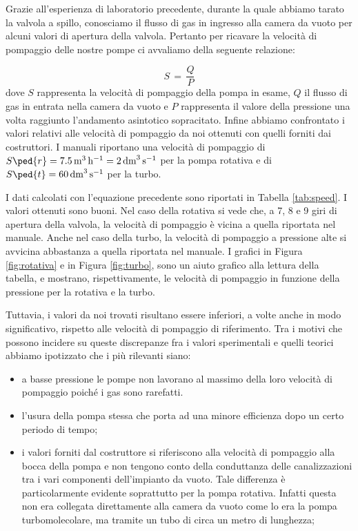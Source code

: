 Grazie all'esperienza di laboratorio precedente, durante la quale abbiamo tarato la valvola a spillo, conosciamo il flusso di gas in ingresso alla camera da vuoto per alcuni valori di apertura della valvola.
Pertanto per ricavare la velocità di pompaggio delle nostre pompe ci avvaliamo della seguente relazione:

\begin{equation}
	S \,=\, \frac{Q}{P}
\end{equation}
%
dove $S$ rappresenta la velocità di pompaggio della pompa in esame, $Q$ il flusso di gas in entrata nella camera da vuoto e $P$ rappresenta il valore della pressione una volta raggiunto l'andamento asintotico sopracitato. Infine abbiamo confrontato i valori relativi alle velocità di pompaggio da noi ottenuti con quelli forniti dai costruttori. I manuali riportano una velocità di pompaggio di $S\ped{r} = \SI{7.5}{\cubic\metre\per\hour} = \SI{2}{\cubic\deci\metre\per\second}$ per la pompa rotativa e di $S\ped{t} = \SI{60}{\cubic\deci\metre\per\second}$ per la turbo.

I dati calcolati con l'equazione precedente sono riportati in Tabella \ref{tab:speed}. I valori ottenuti sono buoni.
Nel caso della rotativa si vede che, a 7, 8 e 9 giri di apertura della valvola, la velocità di pompaggio è vicina a quella riportata
nel manuale. Anche nel caso della turbo, la velocità di pompaggio a pressione alte si avvicina abbastanza a quella riportata nel manuale.
I grafici in Figura \ref{fig:rotativa} e in Figura \ref{fig:turbo}, sono un aiuto grafico alla lettura della tabella, e mostrano,
rispettivamente, le velocità di pompaggio in funzione della pressione per la rotativa e la turbo.

Tuttavia, i valori da noi trovati risultano essere inferiori, a volte anche in modo significativo,
rispetto alle velocità di pompaggio di riferimento. Tra i motivi che possono incidere su
queste discrepanze fra i valori sperimentali e quelli teorici abbiamo ipotizzato che i più rilevanti siano:



\begin{itemize}
    \item{a basse pressione le pompe non lavorano al massimo della loro velocità di pompaggio poiché i gas sono rarefatti.}
	\item{l'usura della pompa stessa che porta ad una minore efficienza dopo un certo periodo di tempo;}
	\item{i valori forniti dal costruttore si riferiscono alla velocità di pompaggio alla bocca della pompa e non tengono conto della conduttanza delle canalizzazioni tra i vari componenti dell'impianto da vuoto. Tale differenza è particolarmente evidente soprattutto per la pompa rotativa. Infatti questa non era collegata direttamente alla camera da vuoto come lo era la pompa turbomolecolare, ma tramite un tubo di circa un metro di lunghezza;}
\end{itemize}


